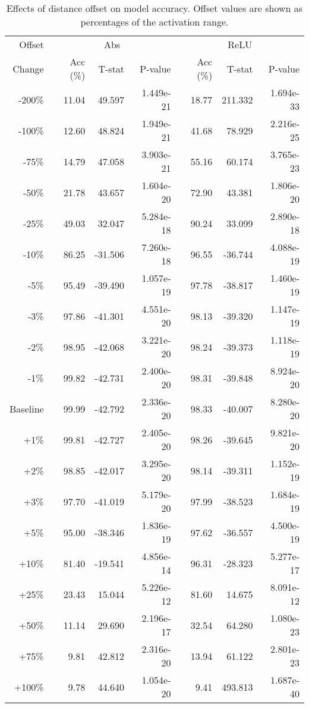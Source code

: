 \begin{table}[h]
\centering
\begin{tabular}{r|rrr|rrr}
Offset & \multicolumn{3}{|c|}{Abs} & \multicolumn{3}{|c}{ReLU} \\
Change & Acc (\%) & T-stat & P-value & Acc (\%) & T-stat & P-value \\
\hline
-200\% & 11.04 & 49.597 & 1.449e-21 & 18.77 & 211.332 & 1.694e-33 \\
-100\% & 12.60 & 48.824 & 1.949e-21 & 41.68 & 78.929 & 2.216e-25 \\
-75\% & 14.79 & 47.058 & 3.903e-21 & 55.16 & 60.174 & 3.765e-23 \\
-50\% & 21.78 & 43.657 & 1.604e-20 & 72.90 & 43.381 & 1.806e-20 \\
-25\% & 49.03 & 32.047 & 5.284e-18 & 90.24 & 33.099 & 2.890e-18 \\
-10\% & 86.25 & -31.506 & 7.260e-18 & 96.55 & -36.744 & 4.088e-19 \\
-5\% & 95.49 & -39.490 & 1.057e-19 & 97.78 & -38.817 & 1.460e-19 \\
-3\% & 97.86 & -41.301 & 4.551e-20 & 98.13 & -39.320 & 1.147e-19 \\
-2\% & 98.95 & -42.068 & 3.221e-20 & 98.24 & -39.373 & 1.118e-19 \\
-1\% & 99.82 & -42.731 & 2.400e-20 & 98.31 & -39.848 & 8.924e-20 \\
Baseline & 99.99 & -42.792 & 2.336e-20 & 98.33 & -40.007 & 8.280e-20 \\
+1\% & 99.81 & -42.727 & 2.405e-20 & 98.26 & -39.645 & 9.821e-20 \\
+2\% & 98.85 & -42.017 & 3.295e-20 & 98.14 & -39.311 & 1.152e-19 \\
+3\% & 97.70 & -41.019 & 5.179e-20 & 97.99 & -38.523 & 1.684e-19 \\
+5\% & 95.00 & -38.346 & 1.836e-19 & 97.62 & -36.557 & 4.500e-19 \\
+10\% & 81.40 & -19.541 & 4.856e-14 & 96.31 & -28.323 & 5.277e-17 \\
+25\% & 23.43 & 15.044 & 5.226e-12 & 81.60 & 14.675 & 8.091e-12 \\
+50\% & 11.14 & 29.690 & 2.196e-17 & 32.54 & 64.280 & 1.080e-23 \\
+75\% & 9.81 & 42.812 & 2.316e-20 & 13.94 & 61.122 & 2.801e-23 \\
+100\% & 9.78 & 44.640 & 1.054e-20 & 9.41 & 493.813 & 1.687e-40 \\
\end{tabular}
\caption{Effects of distance offset on model accuracy. Offset values are shown as percentages of the activation range.}
\label{tab:app_b_offset}
\end{table}

